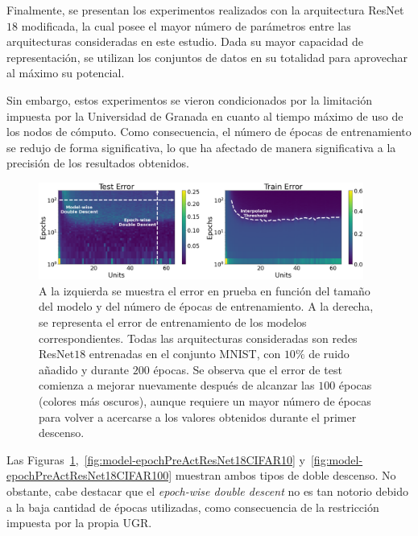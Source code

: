 Finalmente, se presentan los experimentos realizados con la arquitectura ResNet$18$ modificada, la cual posee el mayor número de parámetros entre las arquitecturas consideradas en este estudio. Dada su mayor capacidad de representación, se utilizan los conjuntos de datos en su totalidad para aprovechar al máximo su potencial.

Sin embargo, estos experimentos se vieron condicionados por la limitación impuesta por la Universidad de Granada en cuanto al tiempo máximo de uso de los nodos de cómputo. Como consecuencia, el número de épocas de entrenamiento se redujo de forma significativa, lo que ha afectado de manera significativa a la precisión de los resultados obtenidos.

\begin{figure}[h]
    \centering
    \includegraphics[width=0.95\textwidth]{img/experiments/model-epochPreActResNet18MNIST.png}
    \caption[Doble descenso en función del tamaño del modelo y del número de épocas para la red ResNet$18$ y el conjunto MNIST.]{A la izquierda se muestra el error en prueba en función del tamaño del modelo y del número de épocas de entrenamiento. A la derecha, se representa el error de entrenamiento de los modelos correspondientes. Todas las arquitecturas consideradas son redes ResNet$18$ entrenadas en el conjunto MNIST, con $10\%$ de ruido añadido y durante $200$ épocas. Se observa que el error de test comienza a mejorar nuevamente después de alcanzar las $100$ épocas (colores más oscuros), aunque requiere un mayor número de épocas para volver a acercarse a los valores obtenidos durante el primer descenso.}\label{fig:model-epochPreActResNet18MNIST}
\end{figure}

Las Figuras~\ref{fig:model-epochPreActResNet18MNIST},~\ref{fig:model-epochPreActResNet18CIFAR10} y~\ref{fig:model-epochPreActResNet18CIFAR100} muestran ambos tipos de doble descenso. No obstante, cabe destacar que el \textit{epoch-wise double descent} no es tan notorio debido a la baja cantidad de épocas utilizadas, como consecuencia de la restricción impuesta por la propia UGR.

